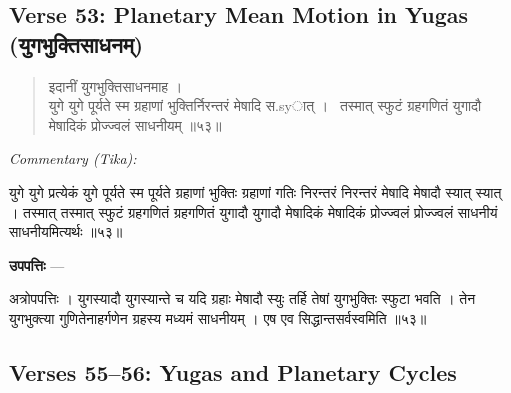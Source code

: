 \documentclass[11pt,a4paper]{article}
\newcommand{\dev}[1]{{\devanagarifont #1}}
\newcommand{\skt}[1]{{\devanagarifont\color{sktcolor} #1}}
\newenvironment{shloka}{%
  \begin{quote}%
  \smallskip%
  \devanagarifont\color{sktcolor}%
}{%
  \smallskip%
  \end{quote}%
}
\newenvironment{tika}{%
  \smallskip%
  \noindent\textit{Commentary (Tika):}\par%
  \smallskip%
  \hindifont\small%
}{%
  \par\smallskip%
}
\newenvironment{upapatti}{%
  \smallskip%
  \noindent\textbf{\devanagarifont उपपत्तिः} — \devanagarifont\small%
}{%
  \par\smallskip%
}
\begin{document}
\subsection*{Verse 53: Planetary Mean Motion in Yugas (\dev{युगभुक्तिसाधनम्})}

\begin{shloka}
\skt{इदानीं युगभुक्तिसाधनमाह ।}\\[0.5em]
\skt{युगे युगे पूर्यते स्म ग्रहाणां भुक्तिर्निरन्तरं मेषादि स.syात् ।}\
\skt{तस्मात् स्फुटं ग्रहगणितं युगादौ मेषादिकं प्रोज्ज्वलं साधनीयम्} ॥५३॥
\end{shloka}

\vspace{0.3cm}
\begin{tika}
\skt{युगे युगे} प्रत्येकं युगे \skt{पूर्यते स्म} पूर्यते \skt{ग्रहाणां भुक्तिः} ग्रहाणां गतिः \skt{निरन्तरं} निरन्तरं \skt{मेषादि} मेषादौ \skt{स्यात्} स्यात् । \skt{तस्मात्} तस्मात् \skt{स्फुटं ग्रहगणितं} ग्रहगणितं \skt{युगादौ} युगादौ \skt{मेषादिकं} मेषादिकं \skt{प्रोज्ज्वलं} प्रोज्ज्वलं \skt{साधनीयं} साधनीयमित्यर्थः ॥५३॥
\end{tika}

\vspace{0.3cm}
\begin{upapatti}
\skt{अत्रोपपत्तिः} । युगस्यादौ युगस्यान्ते च यदि ग्रहाः मेषादौ स्युः तर्हि तेषां युगभुक्तिः स्फुटा भवति । तेन युगभुक्त्या गुणितेनाहर्गणेन ग्रहस्य मध्यमं साधनीयम् । एष एव सिद्धान्तसर्वस्वमिति ॥५३॥
\end{upapatti}

\subsection*{Verses 55--56: Yugas and Planetary Cycles}
\end{document}
